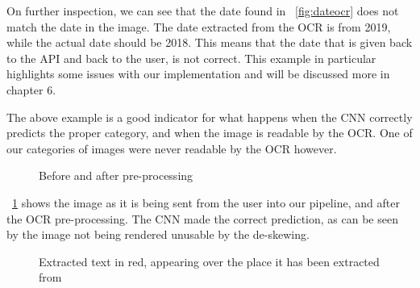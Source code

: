 On further inspection, we can see that the date found in \figurename{~\ref{fig:dateocr}} does not match the date in
the image.
The date extracted from the OCR is from 2019, while the actual date should be 2018.
This means that the date that is given back to the API and back to the user, is not correct.
This example in particular highlights some issues with our implementation and will be discussed more in chapter 6.

The above example is a good indicator for what happens when the CNN correctly predicts the proper category, and when the image is readable by the OCR\@.
One of our categories of images were never readable by the OCR however.

\begin{figure}[h]
    \caption{Before and after pre-processing}
    \label{fig:beforeafterflybuss}
\end{figure}

\figurename{~\ref{fig:beforeafterflybuss}} shows the image as it is being sent from the user into our pipeline, and
after the OCR pre-processing.
The CNN made the correct prediction, as can be seen by the image not being rendered unusable by the de-skewing.

\begin{figure}[h]
    \caption{Extracted text in red, appearing over the place it has been extracted from}
    \label{fig:resultflybuss}
\end{figure}

